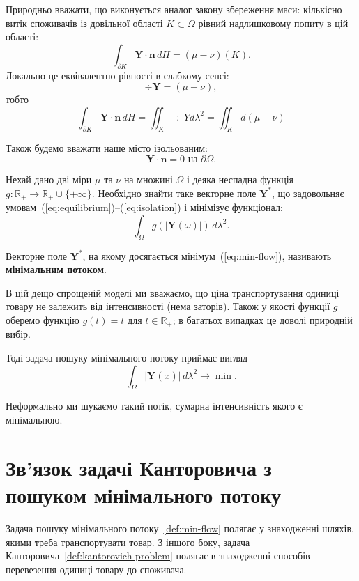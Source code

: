 Природньо вважати, що виконується аналог закону збереження маси:
кількісно витік споживачів із довільної області $K \subset \Omega$ рівний надлишковому попиту в цій області:
\begin{equation*}
    \int_{\partial K} \mathbf{Y} \cdot \mathbf{n}\, dH = (\mu - \nu)(K).
\end{equation*} 
Локально це еквівалентно рівності в слабкому сенсі:
\begin{equation}
    \label{eq:equilibrium}
    \div{\mathbf{Y}} = (\mu - \nu),
\end{equation}
тобто
$$
    \int_{\partial K} \mathbf{Y} \cdot \mathbf{n}\, dH = \iint_{K} \div{Y} d\lambda^2 =
    \iint_{K} d(\mu - \nu)
$$

Також будемо вважати наше місто ізольованим:
\begin{equation}
    \label{eq:isolation}
    \mathbf{Y} \cdot \mathbf{n} = 0\text{ на }\partial \Omega.
\end{equation}

\begin{definition}
    \label{def:min-flow}
    Нехай дано дві міри $\mu$ та $\nu$ на множині $\Omega$
    і деяка неспадна функція $g : \mathbb{R}_+ \to \mathbb{R}_+ \cup \{+\infty\}$.
    Необхідно знайти таке векторне поле $\mathbf{Y}^*$, що задовольняє умовам~(\ref{eq:equilibrium})--(\ref{eq:isolation})
    і мінімізує функціонал:
    \begin{equation}
        \label{eq:min-flow}
         \int_\Omega g\left(\left|\mathbf{Y}(\omega)\right|\right)\, d\lambda^2.
    \end{equation}
       
    Векторне поле $\mathbf{Y}^*$, на якому досягається мінімум~(\ref{eq:min-flow}), називають \textbf{мінімальним потоком}.
\end{definition}

В цій дещо спрощеній моделі ми вважаємо, що ціна транспортування одиниці товару не залежить від інтенсивності (нема заторів).
Також у якості функції $g$ оберемо функцію $g(t) = t$ для $t \in \mathbb{R}_+$; в багатьох випадках це доволі природній вибір.

Тоді задача пошуку мінімального потоку приймає вигляд
$$
    \int_{\Omega} \left|\mathbf{Y}(x)\right|\, d\lambda^2 \to \min.
$$

Неформально ми шукаємо такий потік, сумарна інтенсивність якого є мінімальною.

\section{Зв'язок задачі Канторовича з пошуком мінімального потоку}
Задача пошуку мінімального потоку~\ref{def:min-flow} полягає у
знаходженні шляхів, якими треба транспортувати товар.
З іншого боку, задача Канторовича~\ref{def:kantorovich-problem} полягає в
знаходженні способів перевезення одиниці товару до споживача.

